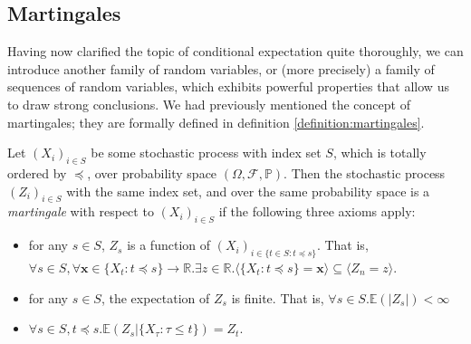 	\subsection{Martingales}
	Having now clarified the topic of conditional expectation quite thoroughly, we can 
	introduce another family of random variables, or (more precisely) a family of sequences of 
	random variables, which exhibits powerful properties that allow us to draw strong 
	conclusions. We had previously mentioned the concept of martingales; they are formally 
	defined in definition \ref{definition:martingales}.
	\begin{definition}[Martingales]
		\label{definition:martingales}
		Let $(X_i)_{i\in S}$ be some stochastic process with index set $S$, which is 
		totally ordered by $\preceq$, over 
		probability space $(\Omega, \mathcal{F},\mathbb{P})$. Then the stochastic process 
		$(Z_i)_{i\in S}$ with the same index set, and over the same probability space is a 
		\emph{martingale} with respect to $(X_i)_{i\in S}$ if the following three axioms 
		apply:
		\begin{itemize}
			\item
			for any $s\in S$, $Z_s$ is a function of $(X_i)_{i \in \{t \in S : 
			t\preceq s\}}$. 
			That is, $\forall s \in S, \forall \mathbf{x}\in \{X_t : t\preceq s\} 
			\rightarrow \mathbb{R} . \exists z \in \mathbb{R} . \langle\{X_t : t 
			\preceq s\} = \mathbf{x}\rangle \subseteq \langle Z_n = z \rangle$.
			\item 
			for any $s\in S$, the expectation of $Z_s$ is finite. That is, 
			$\forall s \in S . \mathbb{E}(|Z_s|) < \infty$
			\item 
			$\forall s \in S, t\preceq s . \mathbb{E}(Z_{s} | \{X_\tau : 
			\tau \leq t\}) = Z_t$.
		\end{itemize}
	\end{definition}
	\begin{comment}
		It is worth highlighting that the third axiom states that the two random variables 
		are equivalent; i.e.\ that any outcome $\omega \in \Omega$ will result in the two 
		having the same value. \\
		It is also worth pointing out that the third axiom may be weakened to obtain 
		related but slightly different notions: $(Z_s)_{s\in S}$ is a \emph{submartingale} 
		with respect to $(X_s)_{s\in S}$ if $\forall s \in S, t\preceq s . \mathbb{E}(Z_{s
		} | \{X_\tau : \tau \leq t\}) \geq Z_t$, where an analogous definition applies to
		\emph{supermartingales}. \\
		Further, the reader should note that the scope of this course will only include 
		what is known as \emph{discrete-time martingales}, where the index set $S$ is 
		countable. The definition given here also considers \emph{continuous-time 
		martingales} for the sake of completeness. \\
		Finally, we call a stochastic process $(X_s)_{s\in S}$ simply a martingale when it 
		is a martingale with respect to itself.
	\end{comment}

